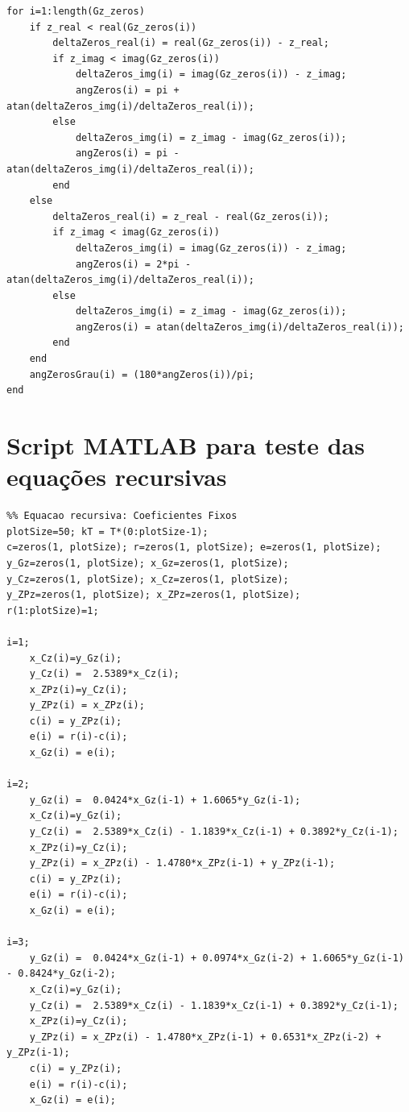 \documentclass[
	article,			%
	11pt,				%
	oneside,			%
	a4paper,			%
	english,			%
	brazil,				%
	sumario=tradicional
	]{abntex2}
\begin{document}
\begin{apendicesenv}
\begin{lstlisting}
for i=1:length(Gz_zeros)
    if z_real < real(Gz_zeros(i))
        deltaZeros_real(i) = real(Gz_zeros(i)) - z_real;        
        if z_imag < imag(Gz_zeros(i))
            deltaZeros_img(i) = imag(Gz_zeros(i)) - z_imag;
            angZeros(i) = pi + atan(deltaZeros_img(i)/deltaZeros_real(i));
        else
            deltaZeros_img(i) = z_imag - imag(Gz_zeros(i));
            angZeros(i) = pi - atan(deltaZeros_img(i)/deltaZeros_real(i));
        end           
    else
        deltaZeros_real(i) = z_real - real(Gz_zeros(i));          
        if z_imag < imag(Gz_zeros(i))
            deltaZeros_img(i) = imag(Gz_zeros(i)) - z_imag;
            angZeros(i) = 2*pi - atan(deltaZeros_img(i)/deltaZeros_real(i));
        else
            deltaZeros_img(i) = z_imag - imag(Gz_zeros(i));
            angZeros(i) = atan(deltaZeros_img(i)/deltaZeros_real(i));
        end                
    end 
    angZerosGrau(i) = (180*angZeros(i))/pi;
end
\end{lstlisting}

\pagebreak

\chapter{Script MATLAB para teste das equações recursivas}
\label{app:scriptEqRecursivas}

\lstset{language=MATLAB}
\begin{lstlisting}
%% Equacao recursiva: Coeficientes Fixos
plotSize=50; kT = T*(0:plotSize-1);
c=zeros(1, plotSize); r=zeros(1, plotSize); e=zeros(1, plotSize);
y_Gz=zeros(1, plotSize); x_Gz=zeros(1, plotSize);
y_Cz=zeros(1, plotSize); x_Cz=zeros(1, plotSize);
y_ZPz=zeros(1, plotSize); x_ZPz=zeros(1, plotSize);
r(1:plotSize)=1;

i=1;      
    x_Cz(i)=y_Gz(i);   
    y_Cz(i) =  2.5389*x_Cz(i);   
    x_ZPz(i)=y_Cz(i);     
    y_ZPz(i) = x_ZPz(i);
    c(i) = y_ZPz(i);
    e(i) = r(i)-c(i);    
    x_Gz(i) = e(i);

i=2;   
    y_Gz(i) =  0.0424*x_Gz(i-1) + 1.6065*y_Gz(i-1);       
    x_Cz(i)=y_Gz(i);   
    y_Cz(i) =  2.5389*x_Cz(i) - 1.1839*x_Cz(i-1) + 0.3892*y_Cz(i-1);   
    x_ZPz(i)=y_Cz(i);     
    y_ZPz(i) = x_ZPz(i) - 1.4780*x_ZPz(i-1) + y_ZPz(i-1);
    c(i) = y_ZPz(i);
    e(i) = r(i)-c(i);    
    x_Gz(i) = e(i);

i=3;
    y_Gz(i) =  0.0424*x_Gz(i-1) + 0.0974*x_Gz(i-2) + 1.6065*y_Gz(i-1) - 0.8424*y_Gz(i-2);       
    x_Cz(i)=y_Gz(i);   
    y_Cz(i) =  2.5389*x_Cz(i) - 1.1839*x_Cz(i-1) + 0.3892*y_Cz(i-1);   
    x_ZPz(i)=y_Cz(i);     
    y_ZPz(i) = x_ZPz(i) - 1.4780*x_ZPz(i-1) + 0.6531*x_ZPz(i-2) + y_ZPz(i-1);
    c(i) = y_ZPz(i);
    e(i) = r(i)-c(i);    
    x_Gz(i) = e(i);
    

\end{lstlisting}
\end{apendicesenv}
\end{document}
